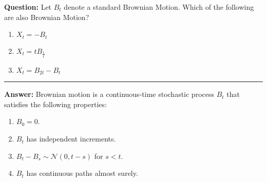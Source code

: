 \documentclass{article}
\begin{document}
\begin{tcolorbox}[colframe=black,colback=gray!5,boxrule=0.5pt]
\textbf{Question:} Let $B_t$ denote a standard Brownian Motion. Which of the following are also Brownian Motion? \cite{Fima}
\begin{enumerate}
    \item $X_t = -B_t$
    \item $X_t = tB_{\frac{1}{t}}$
    \item $X_t = B_{2t} - B_t$
\end{enumerate} 
\vspace{0.2cm}\hrule\vspace{0.2cm}
\textbf{Answer:} Brownian motion is a continuous-time stochastic process \( B_t \) that satisfies the following properties: 
\begin{enumerate}
    \item \( B_0 = 0 \).
    \item \( B_t \) has independent increments.
    \item \( B_t - B_s \sim \mathcal{N}(0, t-s) \) for \( s < t \).
    \item \( B_t \) has continuous paths almost surely.
\end{enumerate}
\end{tcolorbox}





\newpage
 
\end{document}
